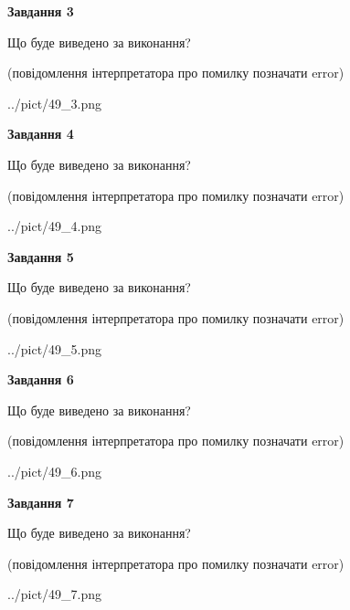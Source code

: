 \documentclass[12pt, ukrainian]{article}
\begin{document}
{\begin {large}
{\begin {center}\textbf{Завдання 3}\end {center}}\par
Що буде виведено за виконання?\par
 (повідомлення інтерпретатора про помилку позначати error)\par
\begin{center}
	{../pict/49_3.png}
\end{center}
\newpage

{\begin {center}\textbf{Завдання 4}\end {center}}\par
Що буде виведено за виконання?\par
 (повідомлення інтерпретатора про помилку позначати error)\par
\begin{center}
	{../pict/49_4.png}
\end{center}
\newpage

{\begin {center}\textbf{Завдання 5}\end {center}}\par
Що буде виведено за виконання?\par
 (повідомлення інтерпретатора про помилку позначати error)\par
\begin{center}
	{../pict/49_5.png}
\end{center}
\newpage

{\begin {center}\textbf{Завдання 6}\end {center}}\par
Що буде виведено за виконання?\par
 (повідомлення інтерпретатора про помилку позначати error)\par
\begin{center}
	{../pict/49_6.png}
\end{center}
\newpage

{\begin {center}\textbf{Завдання 7}\end {center}}\par
Що буде виведено за виконання?\par
 (повідомлення інтерпретатора про помилку позначати error)\par
\begin{center}
	{../pict/49_7.png}
\end{center}
\newpage


\end{large}}
\end{document}
